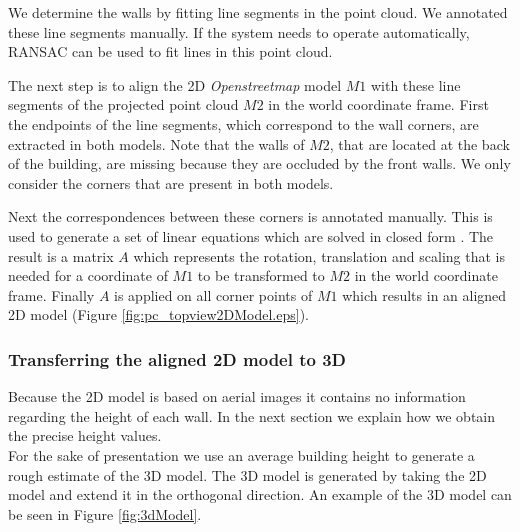 We determine the walls by fitting line segments in the point cloud.  We
annotated these line segments manually.  If the system needs to operate
automatically, RANSAC can be used to fit lines in this point cloud.

\clearpage

The next step is to align the 2D \emph{Openstreetmap\cite{Openstreetmap}} model $M1$ with these line segments of the
projected point cloud $M2$ in the world coordinate frame.  First the endpoints of the line segments, which
correspond to the wall corners, are extracted in both models.
Note that the walls of $M2$, that are located at the back of the building, are missing
because they are occluded by the front walls. We only consider the corners that
are present in both models.

Next the correspondences between these corners is annotated manually. 
This is used to generate a set of linear equations
which are solved in closed form \cite{hartley}. The result is a matrix $A$
which represents the rotation, translation and scaling that is needed for a
coordinate of $M1$ to be transformed to $M2$ in the world coordinate frame.
Finally $A$ is applied on all corner points of $M1$ which results in an aligned 2D
model (Figure \ref{fig:pc_topview2DModel.eps}).






\subsubsection{Transferring the aligned 2D model to 3D}
Because the 2D model is based on aerial images it contains no
information regarding the height of each wall. 
In the next section we explain how we obtain the precise height values.\\

For the sake of presentation we use an average building height to generate a
rough estimate of the 3D model.  The 3D model is generated by taking the 2D model
and extend it in the orthogonal direction.  An example of the 3D model can
be seen in Figure \ref{fig:3dModel}.

